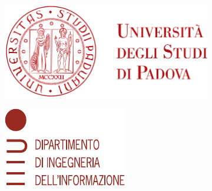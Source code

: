 \newfontfamily{}

\begin{titlepage}
        \begin{figure}
            \centering
            \begin{subfigure}[b]{0.4\textwidth}
                \includegraphics[width=\textwidth]{Immagini/logo_unipd}
            \end{subfigure}
            \hfill
            \begin{subfigure}[b]{0.3\textwidth}
                \includegraphics[width=\textwidth]{Immagini/logo_dei}
            \end{subfigure}
        \end{figure}
    
    
        \begin{center}
            \makeatletter %


\end{center}
\end{titlepage}
